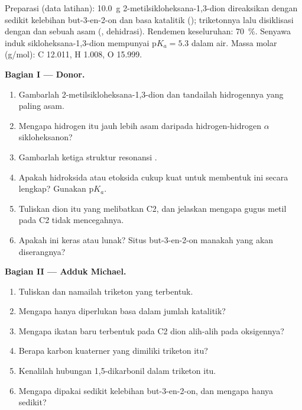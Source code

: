 \begin{problem}
\label{pb:b2:conjugate-additions:1}
Preparasi (data latihan): \qty{10.0}{g} 2-metilsikloheksana-1,3-dion
direaksikan dengan sedikit kelebihan but-3-en-2-on dan basa katalitik
(); triketonnya lalu disiklisasi dengan  dan
sebuah asam (, dehidrasi). Rendemen keseluruhan: 70~\%. Senyawa induk
sikloheksana-1,3-dion mempunyai $\mathrm pK_a = 5.3$ dalam air. Massa molar
(\unit{g/mol}): C 12.011, H 1.008, O 15.999.

\medskip
\noindent\textbf{Bagian I --- Donor.}
\begin{enumerate}
  \item Gambarlah 2-metilsikloheksana-1,3-dion dan tandailah hidrogennya yang paling asam.
  \item Mengapa hidrogen itu jauh lebih asam daripada hidrogen-hidrogen $\alpha$ sikloheksanon?
  \item Gambarlah ketiga struktur resonansi .
  \item Apakah hidroksida atau etoksida cukup kuat untuk membentuk 
        ini secara lengkap? Gunakan $\mathrm pK_a$.
  \item Tuliskan  dion itu yang melibatkan C2, dan jelaskan mengapa
        gugus metil pada C2 tidak mencegahnya.
  \item Apakah  ini keras atau lunak? Situs but-3-en-2-on manakah
        yang akan diserangnya?
\end{enumerate}

\medskip
\noindent\textbf{Bagian II --- Adduk Michael.}
\begin{enumerate}[resume]
  \item Tuliskan  dan namailah triketon yang terbentuk.
  \item Mengapa hanya diperlukan basa dalam jumlah katalitik?
  \item Mengapa ikatan baru terbentuk pada C2 dion alih-alih pada oksigennya?
  \item Berapa karbon kuaterner yang dimiliki triketon itu?
  \item Kenalilah hubungan 1,5-dikarbonil dalam triketon itu.
  \item Mengapa dipakai sedikit kelebihan but-3-en-2-on, dan mengapa hanya sedikit?
\end{enumerate}


\end{problem}
